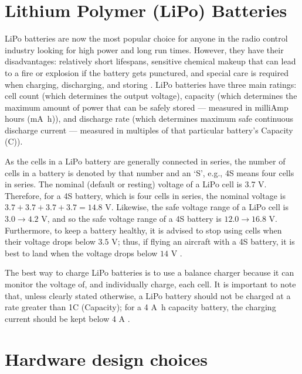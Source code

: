 \section{Lithium Polymer (LiPo) Batteries}\label{sec:lipo_battery}
\ac{LiPo} batteries are now the most popular choice for anyone in the radio control industry looking for high power and long run times. However, they have their disadvantages: relatively short lifespans, sensitive chemical makeup that can lead to a fire or explosion if the battery gets punctured, and special care is required when charging, discharging, and storing \cite{lipo}. \ac{LiPo} batteries have three main ratings: cell count (which determines the output voltage), capacity (which determines the maximum amount of power that can be safely stored --- measured in milliAmp hours (\si{\milli\ampere\hour})), and discharge rate (which determines maximum safe continuous discharge current --- measured in multiples of that particular battery's Capacity (C)).

As the cells in a \ac{LiPo} battery are generally connected in series, the number of cells in a battery is denoted by that number and an `S', e.g., 4S means four cells in series. The nominal (default or resting) voltage of a \ac{LiPo} cell is 3.7 \si{\volt}. Therefore, for a 4S battery, which is four cells in series, the nominal voltage is $3.7+3.7+3.7+3.7 = 14.8$ \si{\volt}. Likewise, the safe voltage range of a \ac{LiPo} cell is $3.0 \rightarrow 4.2$ \si{\volt}, and so the safe voltage range of a 4S battery is $12.0 \rightarrow 16.8$ \si{\volt}. Furthermore, to keep a battery healthy, it is advised to stop using cells when their voltage drops below $3.5$ \si{\volt}; thus, if flying an aircraft with a 4S battery, it is best to land when the voltage drops below $14$ \si{\volt} \cite{lipo_cell_voltages}.

The best way to charge \ac{LiPo} batteries is to use a balance charger because it can monitor the voltage of, and individually charge, each cell. It is important to note that, unless clearly stated otherwise, a \ac{LiPo} battery should not be charged at a rate greater than 1C (Capacity); for a 4 \si{\ampere\hour} capacity battery, the charging current should be kept below 4 \si{\ampere} \cite{lipo_cell_voltages}.








\section{Hardware design choices}\label{sec:design_choices}
